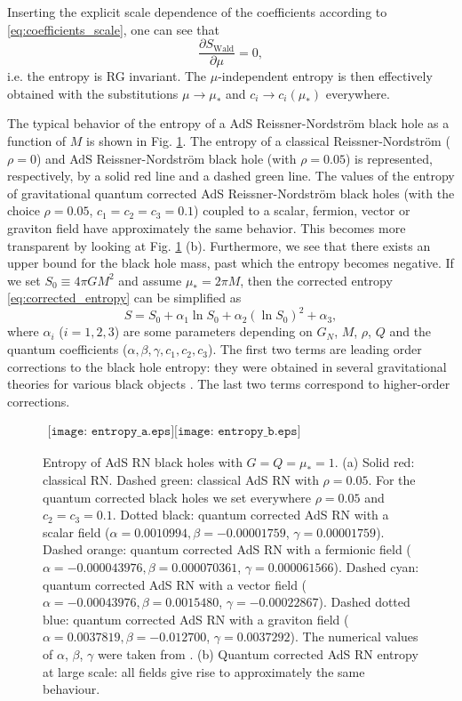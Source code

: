 \documentclass[10pt,a4paper]{article}
\begin{document}
Inserting the explicit scale dependence of the coefficients according to \eqref{eq:coefficients_scale}, one can see that
\begin{equation}
    \frac{\partial S_{\text{Wald}}}{\partial \mu}=0,
\end{equation}
i.e. the entropy is RG invariant. The $\mu$-independent entropy is then effectively obtained with the substitutions $\mu\to\mu_*$ and $c_i\to c_i(\mu_*)$ everywhere.

The typical behavior of the entropy of a AdS Reissner-Nordstr\"om black hole as a function of $M$ is shown in Fig. \ref{fig2}. The entropy of a classical Reissner-Nordstr\"om ($\rho=0$) and AdS Reissner-Nordstr\"om black hole (with $\rho=0.05$) is represented, respectively, by a solid red line and a dashed green line. The values of the entropy of gravitational quantum corrected AdS Reissner-Nordstr\"om black holes (with the choice $\rho=0.05$, $c_1=c_2=c_3=0.1$) coupled to a scalar, fermion, vector or graviton field have approximately the same behavior. This becomes more transparent by looking at Fig. \ref{fig2} (b). Furthermore, we see that there exists an upper bound for the black hole mass, past which the entropy becomes negative.  If we set $S_{0}\equiv4\pi G M^2$ and assume $\mu_{*}=2\pi M$, then the corrected entropy \eqref{eq:corrected_entropy} can be simplified as
\begin{equation}\label{model}
S=S_{0}+\alpha_{1}\ln{S_{0}}+\alpha_{2}(\ln{S_{0}})^{2}+\alpha_{3},
\end{equation}
where $\alpha_{i}$ ($i=1,2,3$) are some parameters depending on $G_{N}$, $M$, $\rho$, $Q$ and the quantum coefficients ($\alpha, \beta, \gamma, c_{1}, c_{2}, c_{3}$). The first two terms are leading order corrections to the black hole entropy: they were obtained in several gravitational theories for various black objects \cite{Das:2001ic, Sadeghi:2016dvc, Castro:2018hsc}. The last two terms correspond to higher-order corrections.
\begin{figure}
\begin{center}$
\begin{array}{cccc}
\texttt{[image: entropy\_a.eps]}\texttt{[image: entropy\_b.eps]}
\end{array}$
\end{center}
\caption{Entropy of AdS RN black holes with $G=Q=\mu_{*}=1$. (a) Solid red: classical RN. Dashed green: classical AdS RN with $\rho=0.05$. For the quantum corrected black holes we set everywhere $\rho=0.05$ and $c_{2}=c_{3}=0.1$. Dotted black: quantum corrected AdS RN with a scalar field ($\alpha=0.0010994, \beta=-0.00001759$, $\gamma=0.00001759$). Dashed orange: quantum corrected AdS RN with a fermionic field ($\alpha=-0.000043976, \beta=0.000070361$, $\gamma=0.000061566$). Dashed cyan: quantum corrected AdS RN with a vector field ($\alpha=-0.00043976, \beta=0.0015480$, $\gamma=-0.00022867$). Dashed dotted blue: quantum corrected AdS RN with a graviton field ($\alpha=0.0037819, \beta=-0.012700$, $\gamma=0.0037292$). The numerical values of $\alpha$, $\beta$, $\gamma$ were taken from \cite{Donoghue:2014yha}. (b) Quantum corrected AdS RN entropy at large scale: all fields give rise to approximately the same behaviour.}
\label{fig2}
\end{figure}
\end{document}
